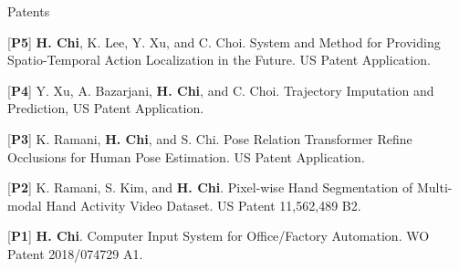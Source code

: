 \begin{cventries}

\cvpub
{Patents}{
\begin{cvitems}
    \item {[\textbf{P5}] \textbf{H. Chi}, K. Lee, Y. Xu, and C. Choi. System and Method for Providing Spatio-Temporal Action Localization in the Future. US Patent Application.}
    \item {[\textbf{P4}] Y. Xu, A. Bazarjani, \textbf{H. Chi}, and C. Choi. Trajectory Imputation and Prediction, US Patent Application.}
    \item {[\textbf{P3}] K. Ramani, \textbf{H. Chi}, and S. Chi. Pose Relation Transformer Refine Occlusions for Human Pose Estimation. US Patent Application.}
    \item {[\textbf{P2}] K. Ramani, S. Kim, and \textbf{H. Chi}. Pixel-wise Hand Segmentation of Multi-modal Hand Activity Video Dataset. US Patent 11,562,489 B2.}
    \item {[\textbf{P1}] \textbf{H. Chi}. Computer Input System for Office/Factory Automation. WO Patent 2018/074729 A1.}
\end{cvitems}
}



\end{cventries}
